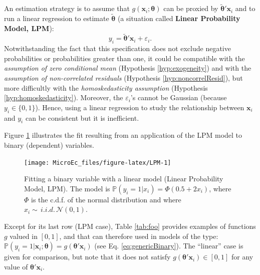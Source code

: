 \documentclass[
  12pt,
]{book}
\theoremstyle{definition}
\theoremstyle{definition}
\theoremstyle{definition}
\theoremstyle{definition}
\theoremstyle{remark}
\begin{document}
An estimation strategy is to assume that \(g(\mathbf{x}_i;\boldsymbol\theta)\) can be proxied by \(\tilde{\boldsymbol\theta}'\mathbf{x}_i\) and to run a linear regression to estimate \(\tilde{\boldsymbol\theta}\) (a situation called \textbf{Linear Probability Model, LPM}):
\[
y_i = \tilde{\boldsymbol\theta}'\mathbf{x}_i + \varepsilon_i.
\]
Notwithstanding the fact that this specification does not exclude negative probabilities or probabilities greater than one, it could be compatible with the \emph{assumption of zero conditional mean} (Hypothesis \ref{hyp:exogeneity}) and with the \emph{assumption of non-correlated residuals} (Hypothesis \ref{hyp:noncorrelResid}), but more difficultly with the \emph{homoskedasticity assumption} (Hypothesis \ref{hyp:homoskedasticity}). Moreover, the \(\varepsilon_i\)'s cannot be Gaussian (because \(y_i \in \{0,1\}\)). Hence, using a linear regression to study the relationship between \(\mathbf{x}_i\) and \(y_i\) can be consistent but it is inefficient.

Figure \ref{fig:LPM} illustrates the fit resulting from an application of the LPM model to binary (dependent) variables.

\begin{figure}
\texttt{[image: MicroEc\_files/figure-latex/LPM-1]} \caption{Fitting a binary variable with a linear model (Linear Probability Model, LPM). The model is $\mathbb{P}(y_i=1|x_i)=\Phi(0.5+2x_i)$, where $\Phi$ is the c.d.f. of the normal distribution and where $x_i \sim \,i.i.d.\,\mathcal{N}(0,1)$.}\label{fig:LPM}
\end{figure}

Except for its last row (LPM case), Table \ref{tab:foo} provides examples of functions \(g\) valued in \([0,1]\), and that can therefore used in models of the type: \(\mathbb{P}(y_i=1|\mathbf{x}_i;\boldsymbol\theta) = g(\boldsymbol\theta'\mathbf{x}_i)\) (see Eq. \eqref{eq:genericBinary}). The ``linear'' case is given for comparison, but note that it does not satisfy \(g(\boldsymbol\theta'\mathbf{x}_i) \in [0,1]\) for any value of \(\boldsymbol\theta'\mathbf{x}_i\).
\end{document}
